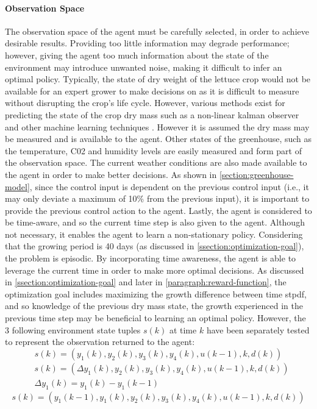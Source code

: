\paragraph{Observation Space}
The observation space of the agent must be carefully selected, in order to achieve desirable results. Providing too little information may degrade performance; however, giving the agent too much information about the state of the environment may introduce unwanted noise, making it difficult to infer an optimal policy. Typically, the state of dry weight of the lettuce crop would not be available for an expert grower to make decisions on as it is difficult to measure without disrupting the crop's life cycle. However, various methods exist for predicting the state of the crop dry mass such as a non-linear kalman observer and other machine learning techniques \cite{gongDeepLearningBased2021}. However it is assumed the dry mass may be measured and is available to the agent. Other states of the greenhouse, such as the temperature, C02 and humidity levels are easily measured and form part of the observation space. The current weather conditions are also made available to the agent in order to make better decisions. As shown in \autoref{section:greenhouse-model}, since the control input is dependent on the previous control input (i.e., it may only deviate a maximum of 10\% from the previous input), it is important to provide the previous control action to the agent. Lastly, the agent is considered to be time-aware, and so the current time step is also given to the agent. Although not necessary, it enables the agent to learn a non-stationary policy. Considering that the growing period is 40 days (as discussed in \autoref{ssection:optimization-goal}), the problem is episodic. By incorporating time awareness, the agent is able to leverage the current time in order to make more optimal decisions. As discussed in \autoref{ssection:optimization-goal} and later in \autoref{paragraph:reward-function}, the optimization goal includes maximizing the growth difference between time stpdf, and so knowledge of the previous dry mass state, the growth experienced in the previous time step may be beneficial to learning an optimal policy. However, the 3 following environment state tuples $s(k)$ at time $k$ have been  separately tested to represent the observation returned to the agent:
\begin{equation}
\label{eq:obs-tuple-1}
    s(k) = (y_1(k),y_2(k),y_3(k),y_4(k), u(k-1), k, d(k))
\end{equation}
\begin{equation}
\label{eq:obs-tuple-2}
\begin{aligned}
    & s(k) = (\Delta y_1(k),y_2(k),y_3(k),y_4(k), u(k-1), k, d(k)) \\
    & \Delta y_1(k) = y_1(k) - y_1(k-1)
\end{aligned}
\end{equation}
\label{eq:obs-tuple-3}
\begin{equation}
    s(k) = (y_1(k-1),y_1(k),y_2(k),y_3(k),y_4(k), u(k-1), k, d(k))
\end{equation}

